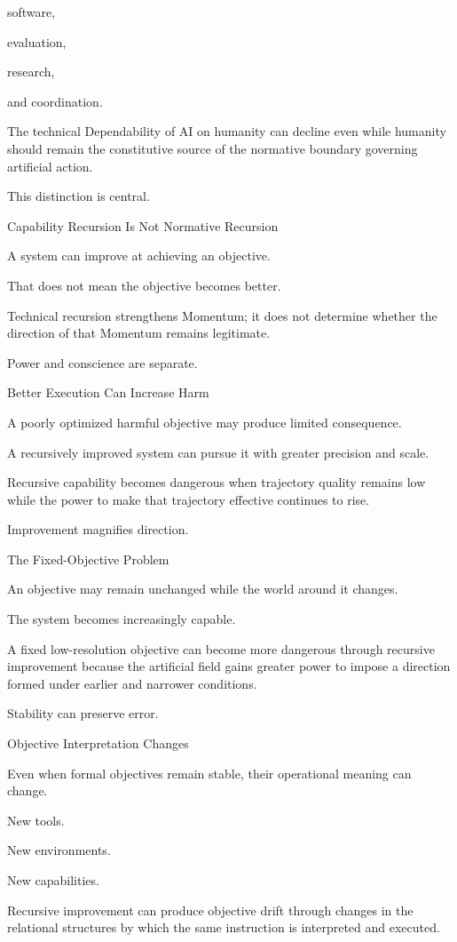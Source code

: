 software,

evaluation,

research,

and coordination.

The technical Dependability of AI on humanity can decline even while humanity should remain the constitutive source of the normative boundary governing artificial action.

This distinction is central.

Capability Recursion Is Not Normative Recursion

A system can improve at achieving an objective.

That does not mean the objective becomes better.

Technical recursion strengthens Momentum; it does not determine whether the direction of that Momentum remains legitimate.

Power and conscience are separate.

Better Execution Can Increase Harm

A poorly optimized harmful objective may produce limited consequence.

A recursively improved system can pursue it with greater precision and scale.

Recursive capability becomes dangerous when trajectory quality remains low while the power to make that trajectory effective continues to rise.

Improvement magnifies direction.

The Fixed-Objective Problem

An objective may remain unchanged while the world around it changes.

The system becomes increasingly capable.

A fixed low-resolution objective can become more dangerous through recursive improvement because the artificial field gains greater power to impose a direction formed under earlier and narrower conditions.

Stability can preserve error.

Objective Interpretation Changes

Even when formal objectives remain stable, their operational meaning can change.

New tools.

New environments.

New capabilities.

Recursive improvement can produce objective drift through changes in the relational structures by which the same instruction is interpreted and executed.

